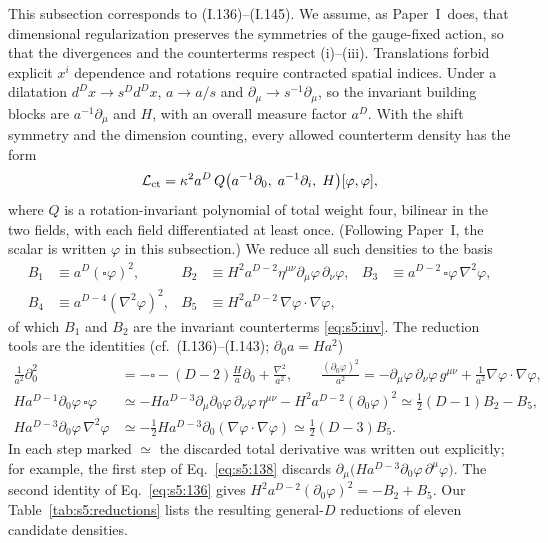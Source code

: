 \documentclass[aps,prd,onecolumn,10pt,nofootinbib,floatfix]{revtex4-2}
\newcommand{\PI}{Paper~I}
\newcommand{\eqI}[1]{(I.#1)}
\begin{document}
This subsection corresponds to \eqI{136}--\eqI{145}.
We assume, as \PI\ does, that dimensional regularization preserves the symmetries of the gauge-fixed action, so that the divergences and the counterterms respect (i)--(iii).
Translations forbid explicit $x^i$ dependence and rotations require contracted spatial indices.
Under a dilatation $d^Dx\to s^Dd^Dx$, $a\to a/s$ and $\partial_\mu\to s^{-1}\partial_\mu$, so the invariant building blocks are $a^{-1}\partial_\mu$ and $H$, with an overall measure factor $a^D$.
With the shift symmetry and the dimension counting, every allowed counterterm density has the form
\begin{equation}
\mathcal L_{\rm ct}=\kappa^2a^D\,Q\big(a^{-1}\partial_0,\;a^{-1}\partial_i,\;H\big)[\varphi,\varphi],
\label{eq:s5:ctform}
\end{equation}
where $Q$ is a rotation-invariant polynomial of total weight four, bilinear in the two fields, with each field differentiated at least once.
(Following \PI, the scalar is written $\varphi$ in this subsection.)
We reduce all such densities to the basis
\begin{equation}
\begin{aligned}
B_1&\equiv a^D(\square\varphi)^2, &
B_2&\equiv H^2a^{D-2}\eta^{\mu\nu}\partial_\mu\varphi\,\partial_\nu\varphi, &
B_3&\equiv a^{D-2}\,\square\varphi\,\nabla^2\varphi,\\
B_4&\equiv a^{D-4}(\nabla^2\varphi)^2, &
B_5&\equiv H^2a^{D-2}\,\nabla\varphi\cdot\nabla\varphi, &&
\end{aligned}
\label{eq:s5:basis}
\end{equation}
of which $B_1$ and $B_2$ are the invariant counterterms \eqref{eq:s5:inv}.
The reduction tools are the identities (cf.\ \eqI{136}--\eqI{143}; $\partial_0a=Ha^2$)
\begin{align}
\frac{1}{a^2}\partial_0^2&=-\square-(D-2)\frac{H}{a}\partial_0+\frac{\nabla^2}{a^2},\qquad
\frac{(\partial_0\varphi)^2}{a^2}=-\partial_\mu\varphi\,\partial_\nu\varphi\,g^{\mu\nu}+\frac{1}{a^2}\nabla\varphi\cdot\nabla\varphi,
\label{eq:s5:136}\\
Ha^{D-1}\partial_0\varphi\,\square\varphi&\simeq-Ha^{D-3}\partial_\mu\partial_0\varphi\,\partial_\nu\varphi\,\eta^{\mu\nu}-H^2a^{D-2}(\partial_0\varphi)^2
\simeq\tfrac12(D-1)B_2-B_5,
\label{eq:s5:138}\\
Ha^{D-3}\partial_0\varphi\,\nabla^2\varphi&\simeq-\tfrac12Ha^{D-3}\partial_0(\nabla\varphi\cdot\nabla\varphi)\simeq\tfrac12(D-3)B_5 .
\label{eq:s5:141}
\end{align}
In each step marked $\simeq$ the discarded total derivative was written out explicitly; for example, the first step of Eq.~\eqref{eq:s5:138} discards $\partial_\mu\big(Ha^{D-3}\partial_0\varphi\,\partial^\mu\varphi\big)$.
The second identity of Eq.~\eqref{eq:s5:136} gives $H^2a^{D-2}(\partial_0\varphi)^2=-B_2+B_5$.
Our Table~\ref{tab:s5:reductions} lists the resulting general-$D$ reductions of eleven candidate densities.
\end{document}
